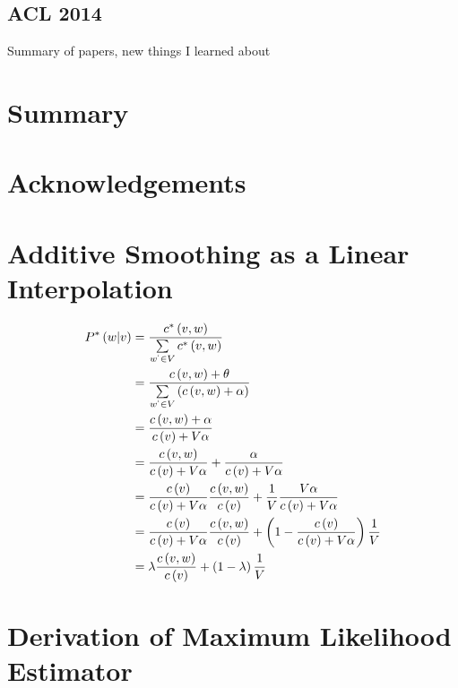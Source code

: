 \documentclass[11pt]{article}
\begin{document}
\subsection{ACL 2014}

{\color{red} Summary of papers, new things I learned about}

\section{Summary}

\section{Acknowledgements}




\appendix
\section{Additive Smoothing as a Linear Interpolation}

\begin{align}
P^*\left(w \vert v \right) &= \frac{c^*\left(v, w\right)}{\sum\limits_{w^` \in V} c^*\left(v, w \right)} \\
&= \frac{c \left( v, w \right) + \theta}{\sum\limits_{w^` \in V} \left( c\left( v, w \right) + \alpha \right)} \\
&= \frac{c \left( v, w \right) + \alpha}{c \left( v \right) + V\alpha} \\
&= \frac{c\left(v, w\right)}{c\left( v \right) + V\alpha} + \frac{\alpha}{c\left( v \right) + V\alpha} \\
&= \frac{c\left( v\right)}{c\left( v\right) + V\alpha} \frac{c\left(v, w\right)}{c\left( v \right)} + \frac{1}{V} \frac{V\alpha}{c\left( v \right) + V\alpha} \\
&= \frac{c\left( v\right)}{c\left( v\right) + V\alpha} \frac{c\left(v, w\right)}{c\left( v \right)} + \left( 1 - \frac{c\left( v\right)}{c\left( v\right) + V\alpha} \right) \frac{1}{V} \\
&= \lambda \frac{c\left(v, w\right)}{c\left( v \right)} + \left(1-\lambda\right) \frac{1}{V}
\end{align}

\section{Derivation of Maximum Likelihood Estimator}
\end{document}
